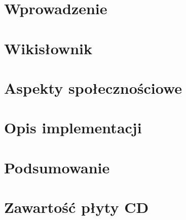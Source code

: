 

\chapter{Wprowadzenie}


\chapter{Wikisłownik}


\chapter{Aspekty społecznościowe}


\chapter{Opis implementacji}


\chapter{Podsumowanie}


\appendix
\chapter{Zawartość płyty CD}



